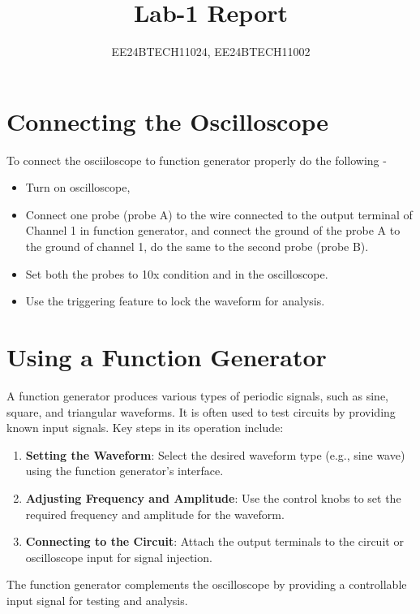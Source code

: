 \documentclass[journal]{IEEEtran}
\begin{document}

\vspace{3cm}

\title{Lab-1 Report}
\author{EE24BTECH11024, EE24BTECH11002}
{\let\newpage\relax\maketitle}

\renewcommand{\thefigure}{\theenumi}
\renewcommand{\thetable}{\theenumi}
\setlength{\intextsep}{10pt} %

\renewcommand{\thetable}{\theenumi}

\section*{Connecting the Oscilloscope}
To connect the osciiloscope to function generator properly do the following -
\begin{itemize}
    \item Turn on oscilloscope, 
    \item Connect one probe (probe A) to the wire connected to the output terminal of Channel 1 in function generator, and connect the ground of the probe A to the ground of channel 1, do the same to the second probe (probe B).
    \item Set both the probes to 10x condition and in the oscilloscope. 
    \item Use the triggering feature to lock the waveform for analysis.
\end{itemize}

\section*{Using a Function Generator}
A function generator produces various types of periodic signals, such as sine, square, and triangular waveforms. It is often used to test circuits by providing known input signals. Key steps in its operation include:
\begin{enumerate}
    \item \textbf{Setting the Waveform}: Select the desired waveform type (e.g., sine wave) using the function generator's interface.
    \item \textbf{Adjusting Frequency and Amplitude}: Use the control knobs to set the required frequency and amplitude for the waveform.
    \item \textbf{Connecting to the Circuit}: Attach the output terminals to the circuit or oscilloscope input for signal injection.
\end{enumerate}
The function generator complements the oscilloscope by providing a controllable input signal for testing and analysis.
\end{document}
